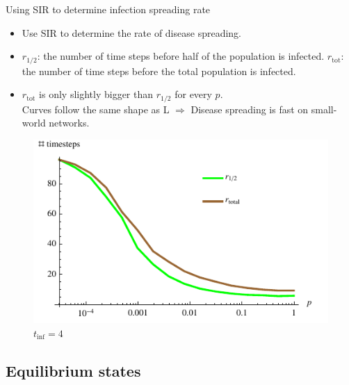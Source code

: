 \documentclass[blackandwhite]{beamer}
\begin{document}
\begin{frame}{Using SIR to determine infection spreading rate}
	\begin{itemize}
	\item
	Use SIR to determine the rate of disease spreading.
	\item
	$r_{1/2}$: the number of time steps before half of the population is infected.
	$r_{\text{tot}}$: the number of time steps before the total population is infected.
	\item
	$r_{\text{tot}}$ is only slightly bigger than $r_{1/2}$ for every $p$.\\
	Curves follow the same shape as L $\Rightarrow$ Disease spreading is fast on small-world networks.
	\end{itemize}
	\begin{center}
	\begin{figure}
	\includegraphics[scale=0.6]{r.pdf}
	\caption{$t_{\text{inf}} = 4$}
	\end{figure}
	\end{center}
\end{frame}

\subsection{Equilibrium states}
\end{document}
